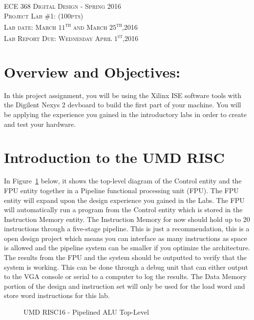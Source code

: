 \documentclass{article}
\begin{document}
\begin{center}
\textsc{\huge ECE 368 Digital Design - Spring 2016}\\[1cm]
\textsc{{\LARGE Project Lab \#1: (100pts)}}\\[0.5cm]
\textsc{\Large Lab date: March $11$\textsuperscript{th} and March $25$\textsuperscript{th},2016}\\[0.5cm]
\textsc{\Large Lab Report Due: Wednesday April $1$\textsuperscript{st},2016}\\[1cm]
\end{center}

\section{Overview and Objectives:}
In this project assignment, you will be using the Xilinx ISE software tools with the Digilent Nexys 2 devboard to build the first part of your machine. You will be applying the experience you gained in the introductory labs in order to create and test your hardware.

\section{Introduction to the UMD RISC}
In Figure~\ref{fig:pipetoplevel} below, it shows the top-level diagram of the Control entity and the FPU entity together in a Pipeline functional processing unit (FPU). The FPU entity will expand upon the design experience you gained in the Labs. The FPU will automatically run a program from the Control entity which is stored in the Instruction Memory entity. The Instruction Memory for now should hold up to 20 instructions through a five-stage pipeline. This is just a recommendation, this is a open design project which means you can interface as many instructions as space is allowed and the pipeline system can be smaller if you optimize the architecture. The results from the FPU and the system should be outputted to verify that the system is working. This can be done through a debug unit that can either output to the VGA console or serial to a computer to log the results. The Data Memory portion of the design and instruction set will only be used for the load word and store word instructions for this lab.

\begin{figure}[!htbp]
  \centering
  \caption{UMD RISC16 - Pipelined ALU Top-Level}
  \label{fig:pipetoplevel}
\end{figure}
\FloatBarrier
\end{document}
